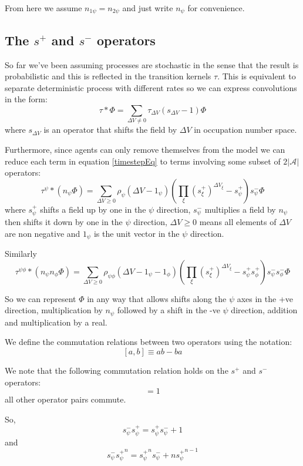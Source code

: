 \documentclass[a4paper]{article}
\begin{document}
From here we assume $n_{1\psi} = n_{2\psi}$ and just write $n_\psi$ for convenience.

\subsection{The $s^+$ and $s^-$ operators}

So far we've been assuming processes are stochastic in the sense that the result is probabilistic and this is reflected in the transition kernels $\tau$. This is equivalent to separate deterministic process with different rates so we can express convolutions in the form:
\[
\tau \ast \Phi = \sum_{\Delta V \ne 0} \tau_{\Delta V}(s_{\Delta V} - 1)\Phi
\]
where $s_{\Delta V}$ is an operator that shifts the field by $\Delta V$ in occupation number space.

Furthermore, since agents can only remove themselves from the model we can reduce each term in equation \ref{timestepEq} to terms involving some subset of $2|\mathcal{A}|$ operators:
\[
\tau^\psi \ast (n_\psi\Phi) = 
\sum_{\Delta V \ge 0 }
\rho_\psi(\Delta V - 1_\psi)
\left(
\prod_{\xi} \left( s^+_\xi\right)^{\Delta V_\xi}  - s^+_\psi
\right)
s^-_\psi \Phi 
\]
where $s^+_\psi$ shifts a field up by one in the $\psi$ direction, $s^-_\psi$ multiplies a field by $n_\psi$ then shifts it down by one in the $\psi$ direction, $\Delta V \ge 0$ means all elements of $\Delta V$ are non negative and $1_\psi$ is the unit vector in the $\psi$ direction.

Similarly 
\[
\tau^{\psi\phi} \ast (n_\psi n_\phi \Phi) = 
\sum_{\Delta V \ge 0}
\rho_{\psi\phi}(\Delta V - 1_\psi - 1_\phi)
\left(
\prod_\xi \left(s^+_\xi\right)^{\Delta V_\xi} - s^+_\psi s^+_\phi
\right)
s^-_\psi s^-_\phi \Phi 
\]

So we can represent $\Phi$ in any way that allows shifts along the $\psi$ axes in the +ve direction, multiplication by $n_\psi$ followed by a shift in the -ve $\psi$ direction, addition and multiplication by a real.

We define the commutation relations between two operators using the notation:
\[
[a,b] \equiv ab - ba
\]

We note that the following commutation relation holds on the $s^+$ and $s^-$ operators:
\begin{equation}
[s^-_\psi, s^+_\psi] = 1
\label{commutationEq}
\end{equation}
all other operator pairs commute.

So,
\[
s^-_\psi s^+_\psi = s^+_\psi s^-_\psi + 1
\]
and
\[
s^-_\psi \left.s^+_\psi\right.^n = \left.s^+_\psi\right.^n s^-_\psi  + n\left.s^+_\psi\right.^{n-1}
\]
\end{document}

